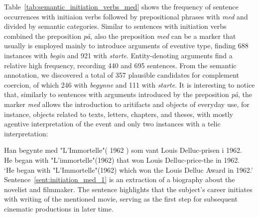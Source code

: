 \documentclass{article}
\begin{document}
Table~\ref{tab:semantic_initiation_verbs_med} shows the frequency of sentence occurrences with initiaion verbs followed by prepositional phrases with \emph{med} and divided by semantic categories. 
Similar to sentences with initiation verbs combined the preposition \emph{på}, also the preposition \emph{med} can be a marker that usually is employed mainly to introduce arguments of eventive type, finding 688 instances with \emph{begin} and 921 with \emph{starte}. Entity-denoting arguments find a relative high frequency, recording 440 and 695 sentences.
From the semantic annotation, we discovered a total of 357 plausible candidates for complement coercion, of which 246 with \emph{begynne} and 111 with \emph{starte}. It is interesting to notice that, similarly to sentences with arguments introduced by the preposition \emph{på}, the marker \emph{med} allows the introduction to aritifacts and objects of everyday use, for instance, objects related to texts, letters, chapters, and theses, with mostly agentive interpretation of the event and only two instances with a telic interpretation:
        \ea \label{sent:initiation_med_1} %

        \gll Han begynte med "L'Immortelle"( 1962 ) som vant Louis Delluc-prisen i 1962.\\
             He began with "L'immortelle"(1962) that won Louis Delluc-price-the in 1962.\\
        \glt ‘He began with "L'Immortelle"(1962) which won the Louis Delluc Award in 1962.’
        \z
Sentence~\ref{sent:initiation_med_1} is an extraction of a biography about the novelist and filmmaker. The sentence highlights that the subject's career initiates with writing of the mentioned movie, serving as the first step for subsequent cinematic productions in later time.
        
\end{document}
